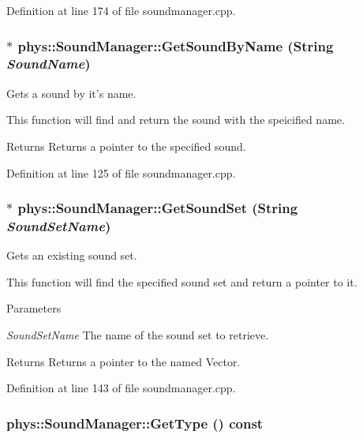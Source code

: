 Definition at line 174 of file soundmanager.cpp.

\hypertarget{classphys_1_1SoundManager_aa325440a688757ad74812b7f093e2423}{
\subsubsection[{GetSoundByName}]{ $\ast$ phys::SoundManager::GetSoundByName ({\bf String} {\em SoundName})}}
\label{d1/dc4/classphys_1_1SoundManager_aa325440a688757ad74812b7f093e2423}


Gets a sound by it's name. 

This function will find and return the sound with the speicified name. \begin{DoxyReturn}{Returns}
Returns a pointer to the specified sound. 
\end{DoxyReturn}


Definition at line 125 of file soundmanager.cpp.

\hypertarget{classphys_1_1SoundManager_a419edd2aed481ed7eff4beb11c9a6cf2}{
\subsubsection[{GetSoundSet}]{ $\ast$ phys::SoundManager::GetSoundSet ({\bf String} {\em SoundSetName})}}
\label{d1/dc4/classphys_1_1SoundManager_a419edd2aed481ed7eff4beb11c9a6cf2}


Gets an existing sound set. 

This function will find the specified sound set and return a pointer to it. 
\begin{DoxyParams}{Parameters}
\item[{\em SoundSetName}]The name of the sound set to retrieve. \end{DoxyParams}
\begin{DoxyReturn}{Returns}
Returns a pointer to the named Vector. 
\end{DoxyReturn}


Definition at line 143 of file soundmanager.cpp.

\hypertarget{classphys_1_1SoundManager_a6815f78a6170b119e2d1d24e862ffbf8}{
\subsubsection[{GetType}]{ phys::SoundManager::GetType () const}}
\label{d1/dc4/classphys_1_1SoundManager_a6815f78a6170b119e2d1d24e862ffbf8}


